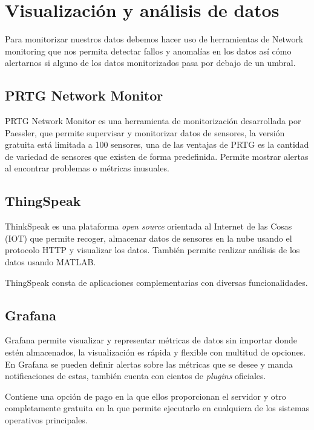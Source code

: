
\section{Visualización y análisis de datos}

Para monitorizar nuestros datos debemos hacer uso de herramientas de Network monitoring que nos permita detectar fallos y anomalías en los datos así cómo alertarnos si alguno de los datos monitorizados pasa por debajo de un umbral.

\subsection{PRTG Network Monitor}

PRTG Network Monitor es una herramienta de monitorización desarrollada por Paessler, que permite supervisar y monitorizar datos de sensores, la versión gratuita está limitada a 100 sensores, una de las ventajas de PRTG es la cantidad de variedad de sensores que existen de forma predefinida. Permite mostrar alertas al encontrar problemas o métricas inusuales.\cite{pagina:PRTG}

\subsection{ThingSpeak}

ThinkSpeak es una plataforma \textit{open source} orientada al Internet de las Cosas (IOT) que permite recoger, almacenar datos de sensores en la nube usando el protocolo HTTP y visualizar los datos. También permite realizar análisis de los datos usando MATLAB. 

ThingSpeak consta de aplicaciones complementarias con diversas funcionalidades. \cite{pagina:ThingSpeak}

\subsection{Grafana}

Grafana permite visualizar y representar métricas de datos sin importar donde estén almacenados, la visualización es rápida y flexible con multitud de opciones. En Grafana se pueden definir alertas sobre las métricas que se desee y manda notificaciones de estas, también cuenta con cientos de \textit{plugins} oficiales. 

Contiene una opción de pago en la que ellos proporcionan el servidor y otro completamente gratuita en la que permite ejecutarlo en cualquiera de los sistemas operativos principales.\cite{pagina:Grafana}

